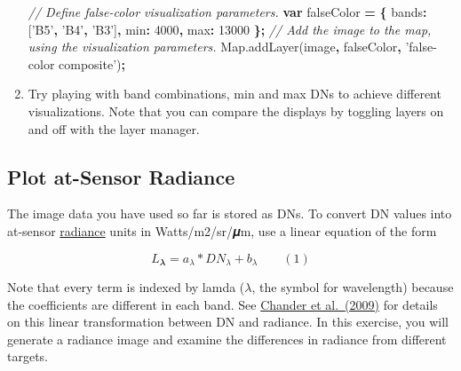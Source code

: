 \documentclass[
]{article}
\newenvironment{Shaded}{\begin{snugshade}}{\end{snugshade}}
\newcommand{\AttributeTok}[1]{\textcolor[rgb]{0.77,0.63,0.00}{#1}}
\newcommand{\CommentTok}[1]{\textcolor[rgb]{0.56,0.35,0.01}{\textit{#1}}}
\newcommand{\DataTypeTok}[1]{\textcolor[rgb]{0.13,0.29,0.53}{#1}}
\newcommand{\DecValTok}[1]{\textcolor[rgb]{0.00,0.00,0.81}{#1}}
\newcommand{\KeywordTok}[1]{\textcolor[rgb]{0.13,0.29,0.53}{\textbf{#1}}}
\newcommand{\NormalTok}[1]{#1}
\newcommand{\OperatorTok}[1]{\textcolor[rgb]{0.81,0.36,0.00}{\textbf{#1}}}
\newcommand{\StringTok}[1]{\textcolor[rgb]{0.31,0.60,0.02}{#1}}
\newcommand{\VariableTok}[1]{\textcolor[rgb]{0.00,0.00,0.00}{#1}}
\begin{document}
\begin{enumerate}
\begin{Shaded}
\begin{Highlighting}[]
\CommentTok{//  Define false-color visualization parameters.   }
\KeywordTok{var}\NormalTok{ falseColor }\OperatorTok{=} \OperatorTok{\{}    \DataTypeTok{bands}\OperatorTok{:}\NormalTok{ [}\StringTok{'B5'}\OperatorTok{,} \StringTok{'B4'}\OperatorTok{,} \StringTok{'B3'}\NormalTok{]}\OperatorTok{,}    \DataTypeTok{min}\OperatorTok{:} \DecValTok{4000}\OperatorTok{,}    \DataTypeTok{max}\OperatorTok{:} \DecValTok{13000}   \OperatorTok{\};}  
\CommentTok{// Add the image to the  map, using the visualization parameters.   }
\VariableTok{Map}\NormalTok{.}\AttributeTok{addLayer}\NormalTok{(image}\OperatorTok{,}\NormalTok{ falseColor}\OperatorTok{,} \StringTok{'false-color composite'}\NormalTok{)}\OperatorTok{;} 
\end{Highlighting}
\end{Shaded}
\item
  Try playing with band combinations, min and max DNs to achieve different visualizations. Note that you can compare the displays by toggling layers on and off with the layer manager.
\end{enumerate}

\hypertarget{plot-at-sensor-radiance}{%
\subsection{Plot at-Sensor Radiance}\label{plot-at-sensor-radiance}}

The image data you have used so far is stored as DNs. To convert DN values into at-sensor \href{https://en.wikipedia.org/wiki/Radiance}{radiance} units in Watts/m2/sr/𝝁m, use a linear equation of the form

\[ L_𝝀 = a_{\lambda} * DN_{\lambda} + b_{\lambda}  \qquad (1) \]

Note that every term is indexed by lamda (\(\lambda\), the symbol for wavelength) because the coefficients are different in each band. See \href{http://www.sciencedirect.com/science/article/pii/S0034425709000169}{Chander et al.~(2009)} for details on this linear transformation between DN and radiance. In this exercise, you will generate a radiance image and examine the differences in radiance from different targets.
\end{document}
